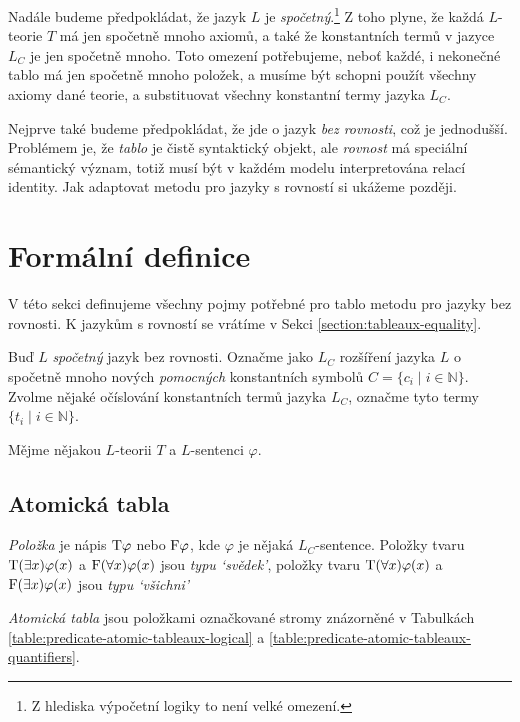 Nadále budeme předpokládat, že jazyk $L$ je \emph{spočetný}.\footnote{Z hlediska výpočetní logiky to není velké omezení.} Z toho plyne, že každá $L$-teorie $T$ má jen spočetně mnoho axiomů, a také že konstantních termů v jazyce $L_C$ je jen spočetně mnoho. Toto omezení potřebujeme, neboť každé, i nekonečné tablo má jen spočetně mnoho položek, a musíme být schopni použít všechny axiomy dané teorie, a substituovat všechny konstantní termy jazyka $L_C$.

Nejprve také budeme předpokládat, že jde o jazyk \emph{bez rovnosti}, což je jednodušší. Problémem je, že \emph{tablo} je čistě syntaktický objekt, ale \emph{rovnost} má speciální sémantický význam, totiž musí být v každém modelu interpretována relací identity. Jak adaptovat metodu pro jazyky s rovností si ukážeme později. 

\section{Formální definice}

V této sekci definujeme všechny pojmy potřebné pro tablo metodu pro jazyky bez rovnosti. K jazykům s rovností se vrátíme v Sekci \ref{section:tableaux-equality}. 

Buď $L$ \emph{spočetný} jazyk bez rovnosti. Označme jako $L_C$ rozšíření jazyka $L$ o spočetně mnoho nových \emph{pomocných} konstantních symbolů $C=\{c_i\mid i\in \mathbb N\}$. Zvolme nějaké očíslování konstantních termů jazyka $L_C$, označme tyto termy $\{t_i\mid i\in\mathbb N\}$.

Mějme nějakou $L$-teorii $T$ a $L$-sentenci $\varphi$.

\subsection{Atomická tabla}

\emph{Položka} je nápis $\mathrm{T}\varphi$ nebo $\mathrm{F}\varphi$, kde $\varphi$ je nějaká $L_C$-sentence. Položky tvaru $\mathrm{T}(\exists x)\varphi(x)$ a $\mathrm{F}(\forall x)\varphi(x)$ jsou \emph{typu `svědek'}, položky tvaru $\mathrm{T}(\forall x)\varphi(x)$ a $\mathrm{F}(\exists x)\varphi(x)$ jsou \emph{typu `všichni'}

\emph{Atomická tabla} jsou položkami označkované stromy znázorněné v Tabulkách \ref{table:predicate-atomic-tableaux-logical} a \ref{table:predicate-atomic-tableaux-quantifiers}.

